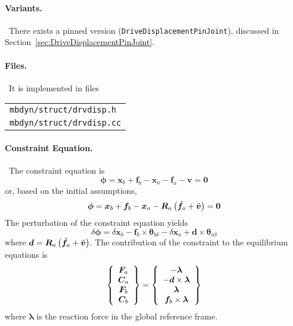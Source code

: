 \documentclass[10pt,dvips,fleqn,subeqn]{report}
\newcommand{\T}[1]{\bm{#1}}
\begin{document}
\paragraph{Variants.} \
There exists a pinned version (\texttt{DriveDisplacementPinJoint}),
discussed in Section~\ref{sec:DriveDisplacementPinJoint}.

\paragraph{Files.} \
It is implemented in files

\begin{tabular}{l}
\texttt{mbdyn/struct/drvdisp.h} \\
\texttt{mbdyn/struct/drvdisp.cc}
\end{tabular}

\paragraph{Constraint Equation.} \
The constraint equation is
\begin{equation}
	\T{\phi} = \T{x}_b + \T{f}_b - \T{x}_a - \T{f}_a - \T{v} = \T{0}
\end{equation}
or, based on the initial assumptions,
\begin{equation}
	\T{\phi} = \T{x}_b + \T{f}_b - \T{x}_a
		- \T{R}_a\plbr{\tilde{\T{f}}_a + \tilde{\T{v}}} = \T{0}
\end{equation}
The perturbation of the constraint equation yields
\begin{equation}
	\delta\T{\phi} = 
		\delta\T{x}_b
		- \T{f}_b\times\T{\theta}_{b\delta}
		- \delta\T{x}_a
		+ \T{d}\times\T{\theta}_{a\delta}
\end{equation}
where $\T{d}=\T{R}_a\plbr{\tilde{\T{f}}_a + \tilde{\T{v}}}$.
The contribution of the constraint to the equilibrium equations is
\begin{equation}
	\cubr{\cvvect{
		\T{F}_a \\
		\T{C}_a \\
		\T{F}_b \\
		\T{C}_b
	}} = \cubr{\cvvect{
		- \T{\lambda} \\
		- \T{d}\times\T{\lambda} \\
		\T{\lambda} \\
		\T{f}_b\times\T{\lambda}
	}}
\end{equation}
where $\T{\lambda}$ is the reaction force in the global reference frame.
\end{document}
